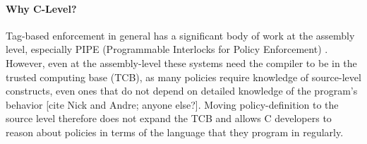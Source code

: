 \documentclass{llncs}
\begin{document}
  \paragraph*{Why C-Level?}
  Tag-based enforcement in general has a significant body of work at the assembly level, especially
  PIPE (Programmable Interlocks for Policy Enforcement) \cite{}. However, even at the assembly-level
  these systems need the compiler to be in the trusted computing base (TCB), as many policies require
  knowledge of source-level constructs, even ones that do not depend on detailed knowledge of the program's
  behavior [cite Nick and Andre; anyone else?]. Moving policy-definition to the source level therefore
  does not expand the TCB and allows C developers to reason about policies in terms of the language that
  they program in regularly.
\end{document}
